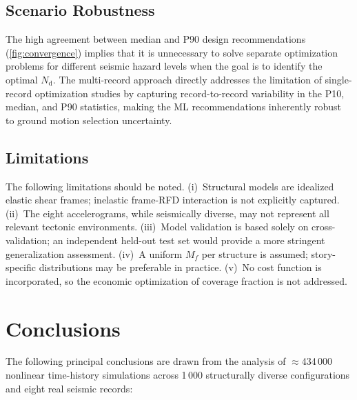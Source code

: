 \documentclass[preprint,12pt,authoryear]{elsarticle}
\newcommand{\nd}{N_{\mathrm{d}}}               %
\newcommand{\Mf}{M_{\!f}}                      %
\begin{document}
\subsection{Scenario Robustness}

The high agreement between median and P90 design recommendations
(\cref{fig:convergence}) implies that it is unnecessary to solve separate
optimization problems for different seismic hazard levels when the goal is to
identify the optimal $\nd$. The multi-record approach directly addresses the
limitation of single-record optimization studies \citep{Jarrahi2020jbe,
Jarrahi2020sdee} by capturing record-to-record variability in the P10, median,
and P90 statistics, making the ML recommendations inherently robust to ground
motion selection uncertainty.

\subsection{Limitations}

The following limitations should be noted. (i)~Structural models are idealized
elastic shear frames; inelastic frame-RFD interaction is not explicitly captured.
(ii)~The eight accelerograms, while seismically diverse, may not represent all
relevant tectonic environments. (iii)~Model validation is based solely on
cross-validation; an independent held-out test set would provide a more
stringent generalization assessment. (iv)~A uniform $\Mf$ per structure is
assumed; story-specific distributions may be preferable in practice. (v)~No
cost function is incorporated, so the economic optimization of coverage fraction
is not addressed.

\section{Conclusions}
\label{sec:conclusions}

The following principal conclusions are drawn from the analysis of
$\approx$434\,000 nonlinear time-history simulations across 1\,000 structurally
diverse configurations and eight real seismic records:
\end{document}
